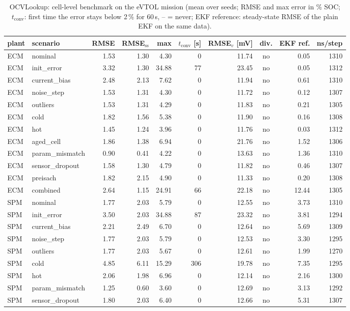 \begin{table}[H]\centering\footnotesize\setlength{\tabcolsep}{4pt}
\caption{OCVLookup: cell-level benchmark on the eVTOL mission (mean over seeds; RMSE and max error in \% SOC; $t_\mathrm{conv}$: first time the error stays below 2\,\% for 60\,s, -- = never; EKF reference: steady-state RMSE of the plain EKF on the same data).}\label{tab:cell_OCVLookup}
\begin{tabular}{llrrrrrcrr}\toprule
plant & scenario & RMSE & RMSE$_\mathrm{ss}$ & max & $t_\mathrm{conv}$ [s] & RMSE$_v$ [mV] & div. & EKF ref. & ns/step \\ \midrule
ECM & nominal & 1.53 & 1.30 & 4.30 & 0 & 11.74 & no & 0.05 & 1310 \\
ECM & init\_error & 3.32 & 1.30 & 34.88 & 77 & 23.45 & no & 0.05 & 1312 \\
ECM & current\_bias & 2.48 & 2.13 & 7.62 & 0 & 11.94 & no & 0.61 & 1310 \\
ECM & noise\_step & 1.53 & 1.31 & 4.30 & 0 & 11.72 & no & 0.12 & 1307 \\
ECM & outliers & 1.53 & 1.31 & 4.29 & 0 & 11.83 & no & 0.21 & 1305 \\
ECM & cold & 1.82 & 1.56 & 5.38 & 0 & 11.90 & no & 0.16 & 1308 \\
ECM & hot & 1.45 & 1.24 & 3.96 & 0 & 11.76 & no & 0.03 & 1312 \\
ECM & aged\_cell & 1.86 & 1.38 & 6.94 & 0 & 21.76 & no & 1.52 & 1306 \\
ECM & param\_mismatch & 0.90 & 0.41 & 4.22 & 0 & 13.63 & no & 1.36 & 1310 \\
ECM & sensor\_dropout & 1.58 & 1.30 & 4.79 & 0 & 11.82 & no & 0.46 & 1307 \\
ECM & preisach & 1.82 & 2.15 & 4.90 & 0 & 11.33 & no & 0.20 & 1308 \\
ECM & combined & 2.64 & 1.15 & 24.91 & 66 & 22.18 & no & 12.44 & 1305 \\
\midrule
SPM & nominal & 1.77 & 2.03 & 5.79 & 0 & 12.55 & no & 3.73 & 1310 \\
SPM & init\_error & 3.50 & 2.03 & 34.88 & 87 & 23.32 & no & 3.81 & 1294 \\
SPM & current\_bias & 2.21 & 2.49 & 6.70 & 0 & 12.64 & no & 5.69 & 1309 \\
SPM & noise\_step & 1.77 & 2.03 & 5.79 & 0 & 12.53 & no & 3.30 & 1295 \\
SPM & outliers & 1.77 & 2.03 & 5.67 & 0 & 12.61 & no & 1.99 & 1270 \\
SPM & cold & 4.85 & 6.11 & 15.29 & 306 & 19.78 & no & 7.35 & 1295 \\
SPM & hot & 2.06 & 1.98 & 6.96 & 0 & 12.14 & no & 2.16 & 1300 \\
SPM & param\_mismatch & 1.25 & 0.60 & 3.60 & 0 & 12.69 & no & 3.13 & 1292 \\
SPM & sensor\_dropout & 1.80 & 2.03 & 6.40 & 0 & 12.66 & no & 5.31 & 1307 \\
\bottomrule\end{tabular}\end{table}
